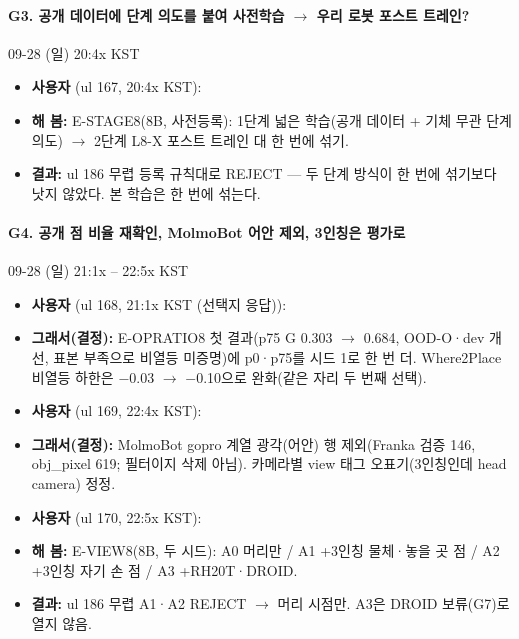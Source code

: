 \paragraph{G3. 공개 데이터에 단계 의도를 붙여 사전학습 $\rightarrow$ 우리 로봇 포스트 트레인?}
{\small 09-28 (일) 20:4x KST}
\begin{itemize}
  \item \textbf{사용자} (ul 167, 20:4x KST): 
  \item \textbf{해 봄:} E-STAGE8(8B, 사전등록): 1단계 넓은 학습(공개 데이터 + 기체 무관 단계 의도) $\rightarrow$ 2단계 L8-X 포스트 트레인 대 한 번에 섞기.
  \item \textbf{결과:} ul 186 무렵 등록 규칙대로 REJECT --- 두 단계 방식이 한 번에 섞기보다 낫지 않았다. 본 학습은 한 번에 섞는다.
\end{itemize}

\paragraph{G4. 공개 점 비율 재확인, MolmoBot 어안 제외, 3인칭은 평가로}
{\small 09-28 (일) 21:1x -- 22:5x KST}
\begin{itemize}
  \item \textbf{사용자} (ul 168, 21:1x KST (선택지 응답)): 
  \item \textbf{그래서(결정):} E-OPRATIO8 첫 결과(p75 G 0.303 $\rightarrow$ 0.684, OOD-O·dev 개선, 표본 부족으로 비열등 미증명)에 p0·p75를 시드 1로 한 번 더. Where2Place 비열등 하한은 $-$0.03 $\rightarrow$ $-$0.10으로 완화(같은 자리 두 번째 선택).
  \item \textbf{사용자} (ul 169, 22:4x KST): 
  \item \textbf{그래서(결정):} MolmoBot gopro 계열 광각(어안) 행 제외(Franka 검증 146, obj\_pixel 619; 필터이지 삭제 아님). 카메라별 view 태그 오표기(3인칭인데 head camera) 정정.
  \item \textbf{사용자} (ul 170, 22:5x KST): 
  \item \textbf{해 봄:} E-VIEW8(8B, 두 시드): A0 머리만 / A1 +3인칭 물체·놓을 곳 점 / A2 +3인칭 자기 손 점 / A3 +RH20T·DROID.
  \item \textbf{결과:} ul 186 무렵 A1·A2 REJECT $\rightarrow$ 머리 시점만. A3은 DROID 보류(G7)로 열지 않음.
\end{itemize}

